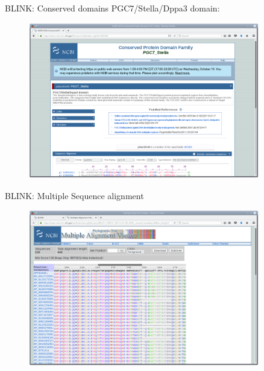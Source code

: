 \documentclass[pdf]{beamer}
\begin{document}
\begin{frame}{BLINK: Conserved domains}
  PGC7/Stella/Dppa3 domain:
  \begin{figure}[ht]
    \includegraphics[width=0.9\textwidth]{images/ncbi_blink_3}
  \end{figure}
  
\end{frame}

\begin{frame}{BLINK: Multiple Sequence alignment}
  \begin{figure}[ht]
    \includegraphics[width=0.9\textwidth]{images/ncbi_blink_4}
  \end{figure}
\end{frame}
\end{document}
